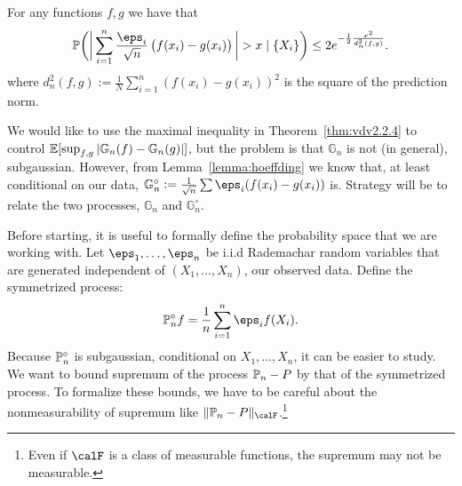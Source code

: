 \begin{example*}
	For any functions \(f,g\) we have that
	\[
		\P\bigg(\bigg|\sum_{i=1}^n \frac{\eps_i}{\sqrt{n}}\left(f(x_i)-g(x_i)\right)\bigg| > x \mid \{X_i\}  \bigg) \leq 2e^{-\frac{1}{2}\frac{x^2}{d_n^2(f,g)}  }
	.\]
	where \(d_n^2(f,g):=\frac{1}{N}\sum_{i=1}^n \left(f(x_i)-g(x_i)\right)^2 \) is the square of the prediction norm.
\end{example*}

We would like to use the maximal inequality in Theorem~\ref{thm:vdv2.2.4} to control \(\E[\sup_{f,g}|\mathbb{G}_n(f)-\mathbb{G}_n(g)|]\), but the problem is that \(\mathbb{G}_n\) is not (in general), subgaussian. However, from Lemma~\ref{lemma:hoeffding} we know that, at least conditional on our data, \(\mathbb{G}^\circ_n :=\frac{1}{\sqrt{n}}\sum \eps_i(f(x_i)-g(x_i)) \) is. Strategy will be to relate the two processes, \(\mathbb{G}_n\) and \(\mathbb{G}^\circ_n\).

Before starting, it is useful to formally define the probability space that we are working with. Let \(\eps_1,\dots,\eps_n\) be i.i.d Rademachar random variables that are generated independent of \((X_1,\dots,X_n)\), our observed data. Define the symmetrized process:
\[
	\P_n^\circ f = \frac{1}{n}\sum_{i=1}^n \eps_if(X_i)
.\] 
Because \(\P_n^\circ\) is subgaussian, conditional on  \(X_1,\dots,X_n\), it can be easier to study. We want to bound supremum of the process \(\P_n-P\) by that of the symmetrized process. To formalize these bounds, we have to be careful about the nonmeasurability of supremum like \(\|\P_n - P\|_\calF\).\footnote{Even if \(\calF\) is a class of measurable functions, the supremum may not be measurable.} 

